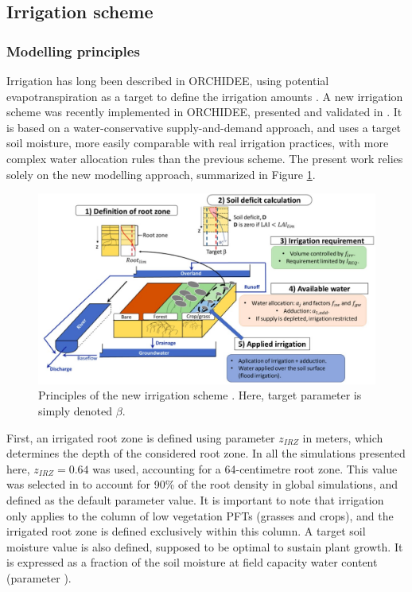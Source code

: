 
\subsection{Irrigation scheme}
\label{sec:irrig_methods}
\subsubsection{Modelling principles}

Irrigation has long been described in ORCHIDEE, using potential evapotranspiration as a target to define the irrigation amounts \citep{de_rosnay_integrated_2003, guimberteau_global_2012}. A new irrigation scheme was recently implemented in ORCHIDEE, presented and validated in \citet{arboleda-obando_validation_2024}. It is based on a water-conservative supply-and-demand approach, and uses a target soil moisture, more easily comparable with real irrigation practices, with more complex water allocation rules than the previous scheme. The present work relies solely on the new modelling approach, summarized in Figure \ref{fig:schema_pedro}.

\begin{figure}[t]
    \centering
    \includegraphics[width=1\textwidth]{images/methods/schema_pedro.png}
    \caption{Principles of the new irrigation scheme \citep[from][]{arboleda-obando_validation_2024}. Here, target parameter \betairrig is simply denoted $\beta$.}
    \label{fig:schema_pedro}
\end{figure}

First, an irrigated root zone is defined using parameter $z_{IRZ}$ in meters, which determines the depth of the considered root zone. In all the simulations presented here, $z_{IRZ} = 0.64$ was used, accounting for a 64-centimetre root zone. This value was selected in \citet{arboleda-obando_validation_2024} to account for 90\% of the root density in global simulations, and defined as the default parameter value. It is important to note that irrigation only applies to the column of low vegetation PFTs (grasses and crops), and the irrigated root zone is defined exclusively within this column.
A target soil moisture value is also defined, supposed to be optimal to sustain plant growth. It is expressed as a fraction of the soil moisture at field capacity water content (parameter \betairrig).

